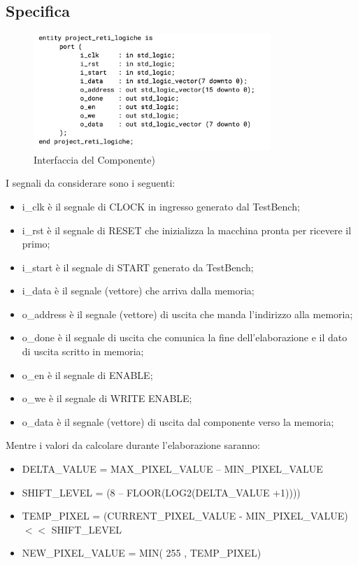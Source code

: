 \documentclass{article}
\begin{document}
\subsection{Specifica}
 \begin{figure}[h]
\centering
\includegraphics[width=0.8\textwidth]{segnali.png}
\caption{Interfaccia del Componente)}
\end{figure}
I segnali da considerare sono i seguenti:
\newline

\begin{itemize}
\item i_clk è il segnale di CLOCK in ingresso generato dal TestBench;
\item i_rst è il segnale di RESET che inizializza la macchina pronta per ricevere il primo;
\item i_start è il segnale di START generato da TestBench;
\item i_data è il segnale (vettore) che arriva dalla memoria;
\item o_address è il segnale (vettore) di uscita che manda l’indirizzo alla memoria;
\item o_done è il segnale di uscita che comunica la fine dell’elaborazione e il dato di uscita scritto in memoria;
\item o_en è il segnale di ENABLE;
\item o_we è il segnale di WRITE ENABLE;
\item o_data è il segnale (vettore) di uscita dal componente verso la memoria;
\end{itemize}
Mentre i valori da calcolare durante l'elaborazione saranno:
\newline
\begin{itemize}
\item DELTA_VALUE = MAX_PIXEL_VALUE – MIN_PIXEL_VALUE
\item SHIFT_LEVEL = (8 – FLOOR(LOG2(DELTA_VALUE +1))))
\item TEMP_PIXEL = (CURRENT_PIXEL_VALUE - MIN_PIXEL_VALUE) \(<<\) SHIFT_LEVEL
\item NEW_PIXEL_VALUE = MIN( 255 , TEMP_PIXEL)
\end{itemize}
\end{document}
